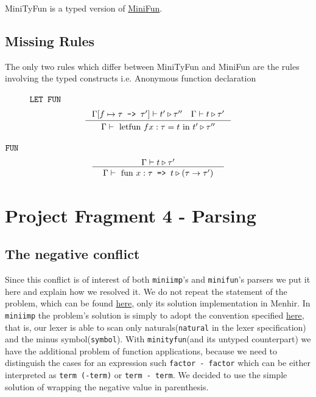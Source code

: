 \documentclass[a4paper,11pt]{report}
\begin{document}
MiniTyFun is a typed version of \hyperref[Section::MiniFun]{MiniFun}. 

\subsection{Missing Rules}

The only two rules which differ between MiniTyFun and MiniFun are the rules involving the typed constructs i.e. Anonymous function declaration 
\begin{figure}[H]
$\verb|LET FUN|$
\\
\[
\inference[]
{ 
	\Gamma[f \mapsto \tau \texttt{ -> } \tau'] \vdash t' \triangleright \tau''\quad
	\Gamma \vdash t \triangleright \tau'
}
{
	\begin{array}{c}
		\Gamma \vdash  \text{ letfun } f x:\tau = t \text{ in } t' \triangleright \tau''
	\end{array}
}
\]	
\end{figure}


$\verb|FUN|$
\\
\[
\inference[]
{ 
\Gamma \vdash t \triangleright \tau'
}
{
\begin{array}{c}
\Gamma \vdash  \text{ fun } x:\tau \texttt{ => } t \triangleright (\tau \rightarrow \tau')
\end{array}
}
\]

\section{Project Fragment 4 - Parsing}\label{chap:parsing}

\subsection{The negative conflict}

Since this conflict is of interest of both \verb|miniimp|'s and \verb|minifun|'s parsers we put it here and explain how we resolved it.
We do not repeat the statement of the problem, which can be found \href{https://lceragioli.github.io/pages/Slides/parsingErrataCorrige.pdf}{here}, only its solution implementation in Menhir.
In \verb|miniimp| the problem's solution is simply to adopt the convention specified \href{https://lceragioli.github.io/pages/Slides/parsingErrataCorrige.pdf}{here}, that is, our lexer is able to scan only naturals(\verb|natural| in the lexer specification) and the minus symbol(\verb|symbol|).
With \verb|minityfun|(and its untyped counterpart) we have the additional problem of function applications, because we need to distinguish the cases for an expression such \verb|factor - factor| which can be either interpreted as \verb|term (-term)| or \verb|term - term|. We decided to use the simple solution of wrapping the negative value in parenthesis.
\end{document}
